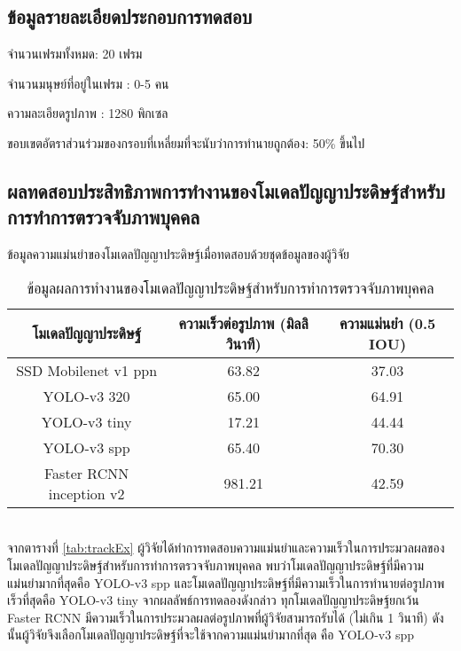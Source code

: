 \subsection{ข้อมูลรายละเอียดประกอบการทดสอบ}
จำนวนเฟรมทั้งหมด: 20 เฟรม

จำนวนมนุษย์ที่อยู่ในเฟรม : 0-5 คน

ความละเอียดรูปภาพ : 1280 พิกเซล

ขอบเขตอัตราส่วนร่วมของกรอบที่เหลี่ยมที่จะนับว่าการทำนายถูกต้อง: 50\% ขึ้นไป


\subsection{ผลทดสอบประสิทธิภาพการทำงานของโมเดลปัญญาประดิษฐ์สำหรับการทำการตรวจจับภาพบุคคล}

ข้อมูลความแม่นยำของโมเดลปัญญาประดิษฐ์เมื่อทดสอบด้วยชุดข้อมูลของผู้วิจัย
\begin{table}[!ht]
	\centering
	\begin{tabular}{|c|c|c|}
			\hline 
			{โมเดลปัญญาประดิษฐ์}&{ความเร็วต่อรูปภาพ (มิลลิวินาที)}&{ความแม่นยำ (0.5 IOU)}			\\
			\hline
			SSD Mobilenet v1 ppn	 					& 63.82 		& 37.03			\\
			YOLO-v3 320							& 65.00		& 64.91		\\
			YOLO-v3 tiny							& 17.21		& 44.44			\\
			YOLO-v3 spp							& 65.40		& 70.30			\\	
			Faster RCNN inception v2					& 981.21		& 42.59		\\
		\hline
	\end{tabular}
	\caption{ข้อมูลผลการทำงานของโมเดลปัญญาประดิษฐ์สำหรับการทำการตรวจจับภาพบุคคล}
    \label{tab:origina_detectEx}
\end{table}
\\
จากตารางที่ \ref{tab:trackEx} ผู้วิจัยได้ทำการทดสอบความแม่นยำและความเร็วในการประมวลผลของโมเดลปัญญาประดิษฐ์สำหรับการทำการตรวจจับภาพบุคคล 
พบว่าโมเดลปัญญาประดิษฐ์ที่มีความแม่นยำมากที่สุดคือ YOLO-v3 spp และโมเดลปัญญาประดิษฐ์ที่มีความเร็วในการทำนายต่อรูปภาพเร็วที่สุดคือ YOLO-v3 tiny จากผลลัพธ์การทดลองดังกล่าว 
ทุกโมเดลปัญญาประดิษฐ์ยกเว้น Faster RCNN มีความเร็วในการประมวลผลต่อรูปภาพที่ผู้วิจัยสามารถรับได้ (ไม่เกิน 1 วินาที) 
ดังนั้นผู้วิจัยจึงเลือกโมเดลปัญญาประดิษฐ์ที่จะใช้จากความแม่นยำมากที่สุด คือ YOLO-v3 spp